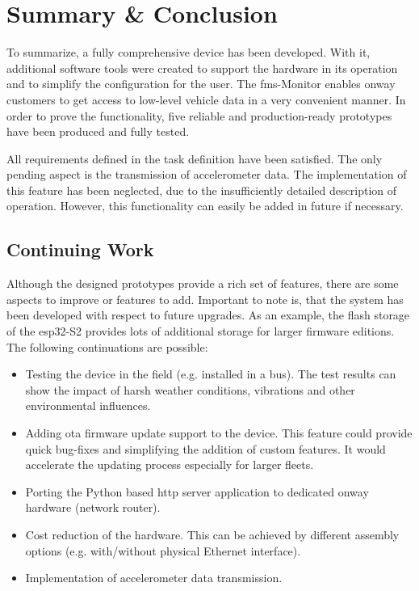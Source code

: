 \chapter{Summary \& Conclusion}
To summarize, a fully comprehensive device has been developed. With it, additional software tools were created to support the hardware in its operation and to simplify the configuration for the user. The \acrshort{fms}-Monitor enables onway customers to get access to low-level vehicle data in a very convenient manner. In order to prove the functionality, five reliable and production-ready prototypes have been produced and fully tested.

All requirements defined in the task definition have been satisfied. The only pending aspect is the transmission of accelerometer data. The implementation of this feature has been neglected, due to the insufficiently detailed description of operation. However, this functionality can easily be added in future if necessary.

\section{Continuing Work}
Although the designed prototypes provide a rich set of features, there are some aspects to improve or features to add. Important to note is, that the system has been developed with respect to future upgrades. As an example, the flash storage of the \gls{esp32}-S2 provides lots of additional storage for larger firmware editions.\\
The following continuations are possible:

\begin{itemize}
		\item Testing the device in the field (e.g. installed in a bus). The test results can show the impact of harsh weather conditions, vibrations and other environmental influences. 
		\item Adding \acrfull{ota} firmware update support to the device. This feature could provide quick bug-fixes and simplifying the addition of custom features. It would accelerate the updating process especially for larger fleets.
		\item Porting the Python based \acrshort{http} server application to dedicated onway hardware (network router).
		\item Cost reduction of the hardware. This can be achieved by different assembly options (e.g. with/without physical Ethernet interface).
		\item Implementation of accelerometer data transmission.
\end{itemize}

